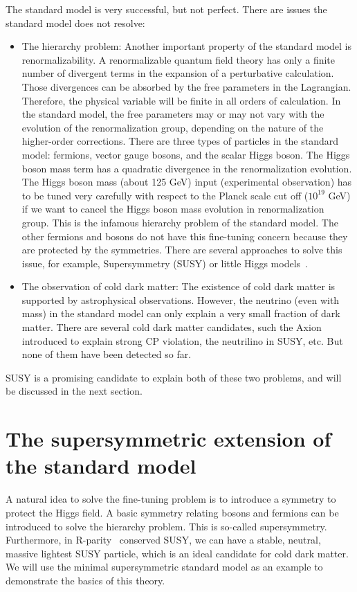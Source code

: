 The standard model is very successful, but not perfect. There are issues the standard model does not resolve:
\begin{itemize}
\item The hierarchy problem: Another important property of the standard model is renormalizability. A renormalizable quantum field theory has only a finite number of divergent terms in the expansion of a perturbative calculation. Those divergences can be absorbed by the free parameters in the Lagrangian. Therefore, the physical variable will be finite in all orders of calculation. In the standard model, the free parameters may or may not vary with the evolution of the renormalization group, depending on the nature of the higher-order corrections. There are three types of particles in the standard model: fermions, vector gauge bosons, and the scalar Higgs boson. The Higgs boson mass term has a quadratic divergence in the renormalization evolution. The Higgs boson mass (about 125 GeV) input (experimental observation) has to be tuned very carefully with respect to the Planck scale cut off ($10^{19}$ GeV) if we want to cancel the Higgs boson mass evolution in renormalization group. This is the infamous hierarchy problem of the standard model. The other fermions and bosons do not have this fine-tuning concern because they are protected by the symmetries. There are several approaches to solve this issue, for example, Supersymmetry (SUSY) or little Higgs models~\cite{Schmaltz:2005ky}. 
\item The observation of cold dark matter: The existence of cold dark matter is supported by astrophysical observations. However, the neutrino (even with mass) in the standard model can only explain a very small fraction of dark matter. There are several cold dark matter candidates, such the Axion introduced to explain strong CP violation, the neutrilino in SUSY, etc. But none of them have been detected so far.
\end{itemize}

SUSY is a promising candidate to explain both of these two problems, and will be discussed in the next section. 

\section{The supersymmetric extension of the standard model}
A natural idea to solve the fine-tuning problem is to introduce a symmetry to protect the Higgs field. A basic symmetry relating bosons and fermions can be introduced to solve the hierarchy problem. This is so-called supersymmetry. Furthermore, in R-parity~\cite{Martin:1997ns} conserved SUSY, we can have a stable, neutral, massive lightest SUSY particle, which is an ideal candidate for cold dark matter. We will use the minimal supersymmetric standard model as an example to demonstrate the basics of this theory. 


